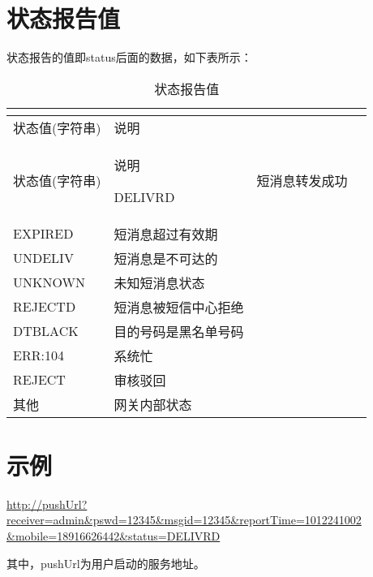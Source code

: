 \documentclass[11pt]{book} %
\begin{document}
\section{状态报告值}

状态报告的值即status后面的数据，如下表所示：


\begin{longtable}{|m{90pt}|m{250pt}|}
\tabularnewline\hline
状态值(字符串)&说明
\endhead

\caption{状态报告值}\\
\hline
状态值(字符串)&说明
\endfirsthead

\endfoot

\endlastfoot

\hline
DELIVRD&短消息转发成功\\
\hline
EXPIRED&短消息超过有效期\\
\hline
UNDELIV&短消息是不可达的\\
\hline
UNKNOWN&未知短消息状态\\
\hline
REJECTD&短消息被短信中心拒绝\\
\hline
DTBLACK&目的号码是黑名单号码\\
\hline
ERR:104&系统忙\\
\hline
REJECT&审核驳回\\
\hline
其他&网关内部状态\\
\hline
\end{longtable}


\section{示例}


{\noindent \url{http://pushUrl?receiver=admin\&pswd=12345\&msgid=12345\&reportTime=1012241002

\&mobile=18916626442\&status=DELIVRD
}
}

其中，pushUrl为用户启动的服务地址。

\end{document}
